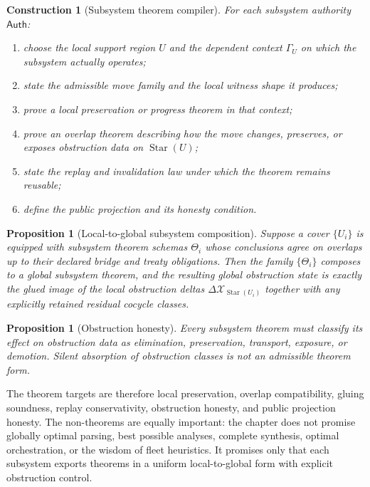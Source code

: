 \documentclass[11pt]{report}
\newtheorem{proposition}[definition]{Proposition}
\newtheorem{construction}[definition]{Construction}
\begin{document}
\begin{construction}[Subsystem theorem compiler]
For each subsystem authority $\mathsf{Auth}$:
\begin{enumerate}
\item choose the local support region $U$ and the dependent context $\Gamma_U$ on which the subsystem actually operates;
\item state the admissible move family and the local witness shape it produces;
\item prove a local preservation or progress theorem in that context;
\item prove an overlap theorem describing how the move changes, preserves, or exposes obstruction data on $\operatorname{Star}(U)$;
\item state the replay and invalidation law under which the theorem remains reusable;
\item define the public projection and its honesty condition.
\end{enumerate}
\end{construction}

\begin{proposition}[Local-to-global subsystem composition]
Suppose a cover $\{U_i\}$ is equipped with subsystem theorem schemas $\Theta_i$ whose conclusions agree on overlaps up to their declared bridge and treaty obligations. Then the family $\{\Theta_i\}$ composes to a global subsystem theorem, and the resulting global obstruction state is exactly the glued image of the local obstruction deltas $\Delta\mathcal{X}_{\operatorname{Star}(U_i)}$ together with any explicitly retained residual cocycle classes.
\end{proposition}

\begin{proposition}[Obstruction honesty]
Every subsystem theorem must classify its effect on obstruction data as elimination, preservation, transport, exposure, or demotion. Silent absorption of obstruction classes is not an admissible theorem form.
\end{proposition}

The theorem targets are therefore local preservation, overlap compatibility, gluing soundness, replay conservativity, obstruction honesty, and public projection honesty. The non-theorems are equally important: the chapter does not promise globally optimal parsing, best possible analyses, complete synthesis, optimal orchestration, or the wisdom of fleet heuristics. It promises only that each subsystem exports theorems in a uniform local-to-global form with explicit obstruction control.
\end{document}
